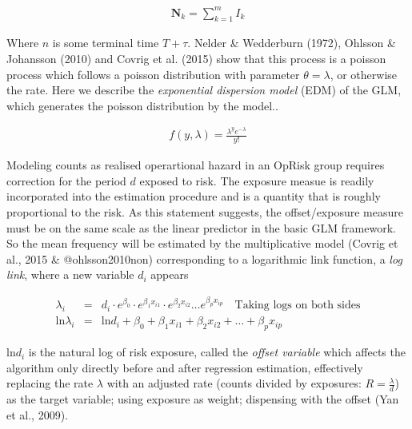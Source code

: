 \documentclass{DissertateUSU}
\begin{document}
\singlespacing

\begin{eqnarray}
\mathbf{N}_k = \sum_{k=1}^m I_k 
\end{eqnarray} \doublespacing

Where \(n\) is some terminal time \(T+\tau\). Nelder \& Wedderburn
(1972), Ohlsson \& Johansson (2010) and Covrig et al. (2015) show that
this process is a poisson process which follows a poisson distribution
with parameter \(\theta = \lambda\), or otherwise the rate. Here we
describe the \emph{exponential dispersion model} (EDM) of the GLM, which
generates the poisson distribution by the model..

\singlespacing

\begin{eqnarray}\label{EDMpoisson}
f(y,\lambda) = \frac{\lambda^ye^{-\lambda}}{y!}
\end{eqnarray} \doublespacing

Modeling counts as realised operartional hazard in an OpRisk group
requires correction for the period \(d\) exposed to risk. The exposure
measue is readily incorporated into the estimation procedure and is a
quantity that is roughly proportional to the risk. As this statement
suggests, the offset/exposure measure must be on the same scale as the
linear predictor in the basic GLM framework. So the mean frequency will
be estimated by the multiplicative model (Covrig et al., 2015 \&
@ohlsson2010non) corresponding to a logarithmic link function, a
\emph{log link}, where a new variable \(d_i\) appears

\singlespacing

\begin{eqnarray}\label{EQlnOffset}
\lambda_i &=& d_i\cdot e^{\beta_0}\cdot e^{\beta_1x_{i1}}\cdot e^{\beta_2x_{i2}} \ldots e^{\beta_px_{ip}}\quad \mbox{Taking logs on both sides}\nonumber\\
\mbox{ln}\lambda_i &=&  \mbox{ln}d_i + \beta_0 + \beta_1x_{i1} + \beta_2x_{i2} + \ldots + \beta_px_{ip}
\end{eqnarray} \doublespacing

ln\(d_i\) is the natural log of risk exposure, called the \emph{offset
variable} which affects the algorithm only directly before and after
regression estimation, effectively replacing the rate \(\lambda\) with
an adjusted rate (counts divided by exposures: \(R=\frac{\lambda}{d}\))
as the target variable; using exposure as weight; dispensing with the
offset (Yan et al., 2009).\medskip  
\end{document}
